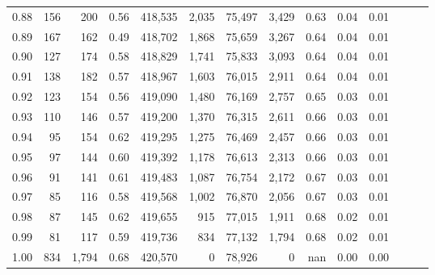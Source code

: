 \begin{tabular}{rrrrrrrrrrrrrr}
0.88 &     156 &    200 &  0.56 &  418,535 &    2,035 &  75,497 &   3,429 &  0.63 &  0.04 &      0.01 \\
0.89 &     167 &    162 &  0.49 &  418,702 &    1,868 &  75,659 &   3,267 &  0.64 &  0.04 &      0.01 \\
0.90 &     127 &    174 &  0.58 &  418,829 &    1,741 &  75,833 &   3,093 &  0.64 &  0.04 &      0.01 \\
0.91 &     138 &    182 &  0.57 &  418,967 &    1,603 &  76,015 &   2,911 &  0.64 &  0.04 &      0.01 \\
0.92 &     123 &    154 &  0.56 &  419,090 &    1,480 &  76,169 &   2,757 &  0.65 &  0.03 &      0.01 \\
0.93 &     110 &    146 &  0.57 &  419,200 &    1,370 &  76,315 &   2,611 &  0.66 &  0.03 &      0.01 \\
0.94 &      95 &    154 &  0.62 &  419,295 &    1,275 &  76,469 &   2,457 &  0.66 &  0.03 &      0.01 \\
0.95 &      97 &    144 &  0.60 &  419,392 &    1,178 &  76,613 &   2,313 &  0.66 &  0.03 &      0.01 \\
0.96 &      91 &    141 &  0.61 &  419,483 &    1,087 &  76,754 &   2,172 &  0.67 &  0.03 &      0.01 \\
0.97 &      85 &    116 &  0.58 &  419,568 &    1,002 &  76,870 &   2,056 &  0.67 &  0.03 &      0.01 \\
0.98 &      87 &    145 &  0.62 &  419,655 &      915 &  77,015 &   1,911 &  0.68 &  0.02 &      0.01 \\
0.99 &      81 &    117 &  0.59 &  419,736 &      834 &  77,132 &   1,794 &  0.68 &  0.02 &      0.01 \\
1.00 &     834 &  1,794 &  0.68 &  420,570 &        0 &  78,926 &       0 &   nan &  0.00 &      0.00 \\
\bottomrule
\end{tabular}
